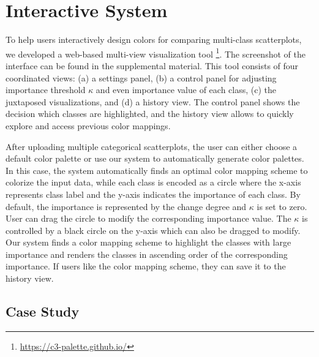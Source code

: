\section{Interactive System}



\label{sec:interaction}
To help users interactively design colors for comparing multi-class scatterplots, we developed a web-based multi-view visualization tool \footnote{\small \url{https://c3-palette.github.io/}}. 
The screenshot of the interface can be found in the supplemental material.
This tool consists of four coordinated views: (a) a settings panel, (b) a control panel for adjusting importance threshold $\kappa$ and even importance value of each class, (c) the juxtaposed visualizations, and (d) a history view. The control panel shows the decision which classes are highlighted, and the history view allows to quickly explore and access previous color mappings.

After uploading multiple categorical scatterplots, the user can either choose a default color palette or use our system to automatically generate color palettes. In this case, the system automatically finds an optimal color mapping scheme to colorize the input data, while each class is encoded as a circle where the x-axis represents class label and the y-axis indicates the importance of each class. By default, the importance is represented by the change degree and $\kappa$ is set to zero. User can drag the circle to modify the corresponding importance value. The $\kappa$ is controlled by a black circle on the y-axis which can also be dragged to modify. Our system finds a color mapping scheme to highlight the classes with large importance and renders the classes in ascending order of the corresponding importance. If users like the color mapping scheme, they can save it to the history view.




\subsection{Case Study}
\label{sec:caseStudy}


